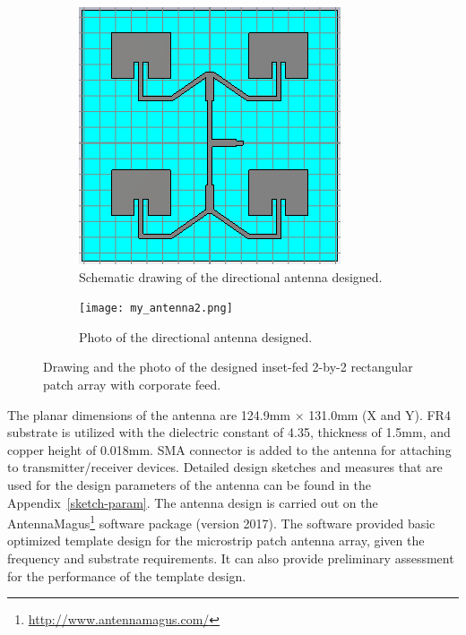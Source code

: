\documentclass[12pt, oneandhalf, chaparabic, sees, ms]{metu}
\begin{document}
\begin{figure}[!htbp]
  \begin{subfigure}[b]{0.45\textwidth}
    \includegraphics[width=\textwidth]{T2x2-rect-pa-corp-feed-FR4-018mm-connected-by-boolean-add-schema.png}
    \caption{Schematic drawing of the directional antenna designed.}
   \label{fig:2x2}
  \end{subfigure}
  \hfill
  \begin{subfigure}[b]{0.5\textwidth}
  \texttt{[image: my\_antenna2.png]}
 \caption{Photo of the directional antenna designed.}
  \label{fig:my_antenna2}
  \end{subfigure}
  \caption{Drawing and the photo of the designed inset-fed 2-by-2 rectangular patch array with corporate feed.}
  \label{fig:dir-photos}
\end{figure}

% 
%
%
%
The planar dimensions of the antenna are 124.9mm $\times$ 131.0mm (X and Y).
FR4 substrate is utilized with the dielectric constant of 4.35, thickness of 1.5mm, and copper height of 0.018mm. 
SMA connector is added to the antenna for attaching to transmitter/receiver devices.
Detailed design sketches and measures that are used for 
the design parameters of the antenna can be found in the Appendix~\ref{sketch-param}.
The antenna design is carried out on the AntennaMagus\footnote{\url{http://www.antennamagus.com/}} software package (version 2017). 
The software provided basic optimized template design for the microstrip patch antenna array, given the frequency and substrate requirements. 
It can also provide preliminary assessment for the performance of the template design. 
\end{document}
